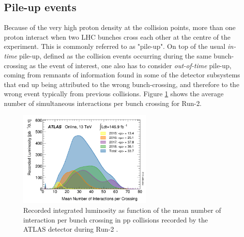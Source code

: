 \subsection{Pile-up events}
\label{chap2:LHC:PU}
Because of the very high proton density at the collision points, more than one proton interact when two LHC bunches cross each other at the centre of the experiment. This is commonly referred to as "pile-up". On top of the usual \textit{in-time} pile-up, defined as the collision events occurring during the same bunch-crossing as the event of interest, one also has to consider \textit{out-of-time} pile-up, coming from remnants of information found in some of the detector subsystems that end up being attributed to the wrong bunch-crossing, and therefore to the wrong event typically from previous collisions. Figure \ref{fig:chap2:LHC:PU} shows the average number of simultaneous interactions per bunch crossing for Run-2. \\
\begin{figure}[htbp]
    \centering
    \includegraphics[width=0.6\textwidth]{Ch2/Img/PU.png}
    \caption{Recorded integrated luminosity as function of the mean number of interaction per bunch crossing in pp collisions recorded by the ATLAS detector during Run-2 \cite{Lumi2018}.}
    \label{fig:chap2:LHC:PU}
\end{figure}

